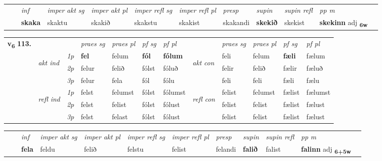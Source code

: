\begin{tabular}{llllllllllll}
 & & \textit{inf} & \textit{imper akt sg} & \textit{imper akt pl} & \textit{imper refl sg} & \textit{imper refl pl} & \textit{presp} & \textit{supin} & \textit{supin refl} & \textit{pp m}     \\*
  & & \textbf{skaka} & skaktu  & skakið & skakstu & skakist & skakandi &  \textbf{skekið} & skekist & \textbf{skekinn} adj \textbf{\textsubscript{6w}} \\*
\cmidrule{1-12}
\end{tabular}



\begin{tabular}{llllllllllll} \toprule
\multirow{4}{*}{{{\textbf{v{\textsubscript{6}}} \Large{\textbf{113.}}}}}  & &   &  \textit{praes sg}  & \textit{praes pl}  &\textit{ pf sg} & \textit{pf pl} &  &  \textit{praes sg}  & \textit{praes pl}  & \textit{pf sg} & \textit{pf pl } \\*
	\cmidrule{4-7} \cmidrule{9-12}
 & \multirow{3}{*}{\begin{turn}{90}\textit{akt ind}\end{turn}} & {\textit{1p}} & \textbf{fel} & felum    & \textbf{fól} & \textbf{fólum} & \multirow{3}{*}{\begin{turn}{90}\textit{akt con}\end{turn}} &feli & felum & \textbf{fæli} & fælum\\*
& &  {\textit{2p}} &  felur  & felið   & fólst & fóluð & & felir & felið & fælir & fæluð \\*
& &  {\textit{3p}} & felur & fela   & fól & fólu & & feli & feli& fæli & fælu  \\*
\cmidrule{4-7} \cmidrule{9-12}
 &\multirow{3}{*}{\begin{turn}{90}\textit{refl ind}\end{turn}} & {\textit{1p}} & felst & felumst    & fólst & fólumst & \multirow{3}{*}{\begin{turn}{90}\textit{refl con}\end{turn}}  &felist & felumst & fælist & fælumst\\*
 &&  {\textit{2p}} &  felst  & felist   & fólst & fólust & &felist & felist & fælist & fælust \\*
& &  {\textit{3p}} & felst & felast   & fólst & fólust & & felist & felist& fælist & fælust  \\*
\cmidrule{4-7} \cmidrule{9-12}
\end{tabular}


\begin{tabular}{llllllllllll}
 & & \textit{inf} & \textit{imper akt sg} & \textit{imper akt pl} & \textit{imper refl sg} & \textit{imper refl pl} & \textit{presp} & \textit{supin} & \textit{supin refl} & \textit{pp m}     \\*
  & & \textbf{fela} & feldu  & felið & felstu & felist & felandi &  \textbf{falið} & falist & \textbf{falinn} adj \textbf{\textsubscript{6+5w}} \\*
\cmidrule{1-12}
\end{tabular}



